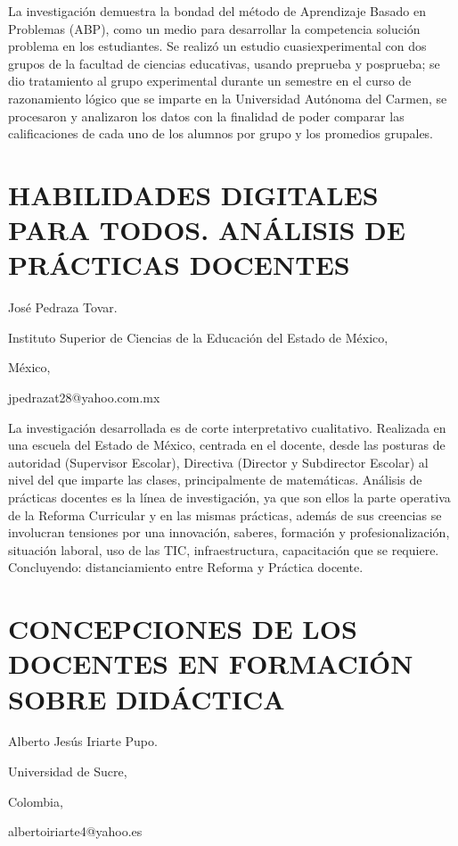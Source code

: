 La investigación demuestra la bondad del método de Aprendizaje Basado
en Problemas (ABP), como un medio para desarrollar la competencia
solución problema en los estudiantes. Se realizó un estudio cuasiexperimental
con dos grupos de la facultad de ciencias educativas, usando preprueba
y posprueba; se dio tratamiento al grupo experimental durante un semestre
en el curso de razonamiento lógico que se imparte en la Universidad
Autónoma del Carmen, se procesaron y analizaron los datos con la finalidad
de poder comparar las calificaciones de cada uno de los alumnos por
grupo y los promedios grupales. 


\section{HABILIDADES DIGITALES PARA TODOS. ANÁLISIS DE PRÁCTICAS DOCENTES }

\begin{datos}

José Pedraza Tovar.

Instituto Superior de Ciencias de la Educación del Estado de México,

México,

jpedrazat28@yahoo.com.mx 

\end{datos}

La investigación desarrollada es de corte interpretativo cualitativo.
Realizada en una escuela del Estado de México, centrada en el docente,
desde las posturas de autoridad (Supervisor Escolar), Directiva (Director
y Subdirector Escolar) al nivel del que imparte las clases, principalmente
de matemáticas. Análisis de prácticas docentes es la línea de investigación,
ya que son ellos la parte operativa de la Reforma Curricular y en
las mismas prácticas, además de sus creencias se involucran tensiones
por una innovación, saberes, formación y profesionalización, situación
laboral, uso de las TIC, infraestructura, capacitación que se requiere.
Concluyendo: distanciamiento entre Reforma y Práctica docente.


\section{CONCEPCIONES DE LOS DOCENTES EN FORMACIÓN SOBRE DIDÁCTICA}

\begin{datos}

Alberto Jesús Iriarte Pupo. 

Universidad de Sucre,

Colombia,

albertoiriarte4@yahoo.es

\end{datos}


